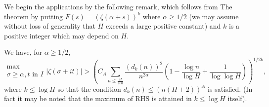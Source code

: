 We begin the applications by the following remark, which follows from The theorem by putting $F(s) =(\zeta (\alpha +s ))^k$ where $\alpha \geqslant 1/2$ (we may assume without loss of generality that $H$ exceeds a large positive constant) and $k$ is a positive integer which may depend on $H$.

\begin{theorem}\label{art2-thm2}
We have, for $\alpha \geqslant 1/2$,
\begin{equation*}
\begin{matrix}
\max \\
\sigma \geqslant \alpha, t \text{ in } I 
\end{matrix}
|\zeta (\sigma + it)| >  \left(C_A \sum\limits_{n \leqslant \frac{H}{100}} \frac{(d_k (n))^2}{n^{2\alpha}} \left(1 - \frac{\log n }{\log H} + \frac{1}{\log \log H}\right) \right)^{1/2k},
\end{equation*}
where $k \leqslant \log H$ so that the condition $d_k (n) \leqslant (n(H+2))^A$ is satisfied. (In fact it may be noted that the maximum of {\rm RHS} is attained in $k \leqslant \log H$ itself).
\end{theorem}

